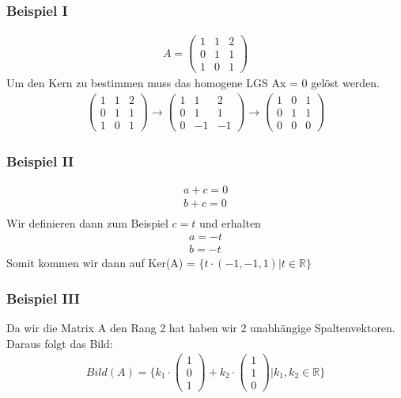 \begin{frame}
	\frametitle{Beispiel I}
	\begin{align*}
		A = \begin{pmatrix}
			1 & 1 & 2 \\
			0 & 1 & 1 \\
			1 & 0 & 1 
		\end{pmatrix}
	\end{align*}
	Um den Kern zu bestimmen muss das homogene LGS Ax = 0 gelöst werden.
	\begin{align*}
		\begin{pmatrix}
			1 & 1 & 2 \\
			0 & 1 & 1 \\
			1 & 0 & 1 
		\end{pmatrix} \rightarrow
		\begin{pmatrix}
			1 & 1 & 2 \\
			0 & 1 & 1 \\
			0 & -1 & -1 
		\end{pmatrix} \rightarrow
		\begin{pmatrix}
			1 & 0 & 1 \\
			0 & 1 & 1 \\
			0 & 0 & 0 
		\end{pmatrix} 
	\end{align*}
\end{frame}

\begin{frame}
	\frametitle{Beispiel II}
	\begin{align*}
		a + c = 0 \\
		b + c = 0 \\
	\end{align*}
	Wir definieren dann zum Beispiel $c = t$ und erhalten
	\begin{align*}
		a = -t \\
		b = -t 
	\end{align*}
	Somit kommen wir dann auf Ker(A) = 
	$\{t \cdot (-1, -1, 1) | t \in \mathbb{R}\}$
\end{frame}

\begin{frame}
	\frametitle{Beispiel III}
	Da wir die Matrix A den Rang 2 hat haben wir 2 unabhängige Spaltenvektoren.
	Daraus folgt das Bild:
	\begin{align*}
		Bild(A) = \{k_1 \cdot \begin{pmatrix}
			1 \\
			0 \\
			1 
		\end{pmatrix} + k_2 \cdot \begin{pmatrix}
			1 \\
			1 \\
			0 
		\end{pmatrix} | k_1, k_2 \in \mathbb{R}\}
	\end{align*}
\end{frame}
